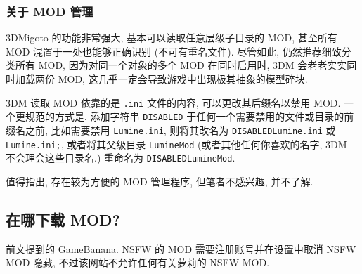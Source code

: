             \subsubsection{关于 MOD 管理}
                \par 3DMigoto 的功能非常强大, 基本可以读取任意层级子目录的 MOD, 甚至所有 MOD 混置于一处也能够正确识别 (不可有重名文件). 尽管如此, 仍然推荐细致分类所有 MOD, 因为对同一个对象的多个 MOD 在同时启用时, 3DM 会老老实实同时加载两份 MOD, 这几乎一定会导致游戏中出现极其抽象的模型碎块.
                \par 3DM 读取 MOD 依靠的是 \texttt{.ini} 文件的内容, 可以更改其后缀名以禁用 MOD. 一个更规范的方式是, 添加字符串 \texttt{DISABLED} 于任何一个需要禁用的文件或目录的前缀名之前, 比如需要禁用 \texttt{Lumine.ini}, 则将其改名为 \texttt{{\color{blue!50}DISABLED}Lumine.ini} 或 \texttt{Lumine.ini{\color{blue!50};}}, 或者将其父级目录 \texttt{LumineMod} (或者其他任何你喜欢的名字, 3DM 不会理会这些目录名.) 重命名为 \texttt{{\color{blue!50}DISABLED}LumineMod}.
                \par 值得指出, 存在较为方便的 MOD 管理程序, 但笔者不感兴趣, 并不了解.
        \subsection{在哪下载 MOD?}
            \par 前文提到的 \href{https://gamebanana.com/}{GameBanana}. NSFW 的 MOD 需要注册账号并在设置中取消 NSFW MOD 隐藏, 不过该网站不允许任何有关萝莉的 NSFW MOD.